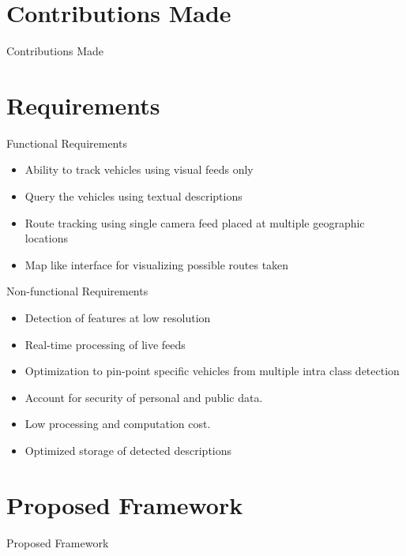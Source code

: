 \documentclass{beamer}
\begin{document}

\section{Contributions Made}
\begin{frame}{Contributions Made}
\end{frame}


\section{Requirements}
\begin{frame}{Functional Requirements}
	\begin{itemize}
		\item Ability to track vehicles using visual feeds only
		\item Query the vehicles using textual descriptions
		\item Route tracking using single camera feed placed at multiple geographic locations
		\item Map like interface for visualizing possible routes taken
		
	\end{itemize}
\end{frame}

\begin{frame}{Non-functional Requirements}
    \begin{itemize}
        \item Detection of features at low resolution
        \item Real-time processing of live feeds
        \item Optimization to pin-point specific vehicles from multiple intra class detection
        \item Account for security of personal and public data.
        \item Low processing and computation cost.
        \item Optimized storage of detected descriptions
    \end{itemize}
\end{frame}


\section{Proposed Framework}
\begin{frame}{Proposed Framework}
\end{frame}
\end{document}
